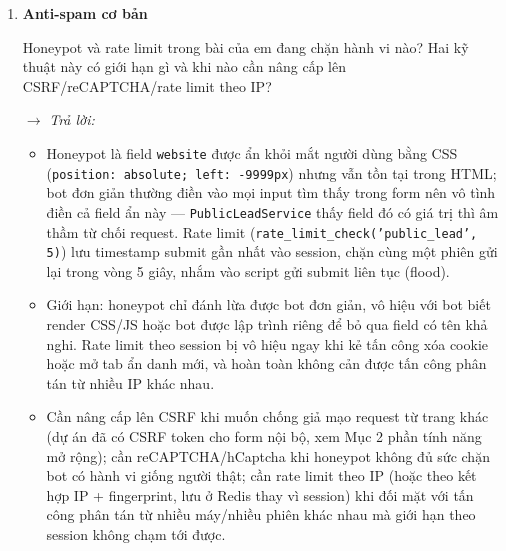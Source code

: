 \begin{enumerate}[label = \textbf{\arabic*.}, leftmargin=*]
    \begin{itemize}[leftmargin = 0.55cm, label = $\bullet$]
        \item Sau \texttt{POST /public-leads} thành công, controller gọi \texttt{redirect('/public-leads/create')} kèm \texttt{flash\_set('success', ...)}. Sau \texttt{POST /leads/store}, \texttt{/leads/update}, \texttt{/leads/delete} (và tương tự cho \texttt{/payments/*}), controller đều \texttt{redirect('/leads')} (hoặc về đúng trang danh sách với query hiện tại) thay vì render HTML ngay trên response của POST.
        \item Nếu render trực tiếp trên POST, trình duyệt sẽ giữ nguyên request đó trong lịch sử: khi người dùng bấm F5 (hoặc bấm Back rồi Forward), trình duyệt hiện hộp thoại ``xác nhận gửi lại form'' — nếu người dùng đồng ý, toàn bộ dữ liệu POST cũ (họ tên, email, số tiền, \ldots) được gửi lại y hệt, tạo thêm một lead hoặc một phiếu thanh toán trùng lặp trong cơ sở dữ liệu mà người dùng không cố ý. Với thao tác xóa, F5 lại có thể vô tình gọi lại đúng lệnh xóa một lần nữa.
    \end{itemize}

    \item \textbf{Anti-spam cơ bản}

    Honeypot và rate limit trong bài của em đang chặn hành vi nào? Hai kỹ thuật này có giới hạn gì và khi nào cần nâng cấp lên CSRF/reCAPTCHA/rate limit theo IP?

    \hspace*{-0.6cm} $\rightarrow$ \textit{Trả lời:}

    \begin{itemize}[leftmargin = 0.55cm, label = $\bullet$]
        \item Honeypot là field \texttt{website} được ẩn khỏi mắt người dùng bằng CSS (\texttt{position: absolute; left: -9999px}) nhưng vẫn tồn tại trong HTML; bot đơn giản thường điền vào mọi input tìm thấy trong form nên vô tình điền cả field ẩn này — \texttt{PublicLeadService} thấy field đó có giá trị thì âm thầm từ chối request. Rate limit (\texttt{rate\_limit\_check('public\_lead', 5)}) lưu timestamp submit gần nhất vào session, chặn cùng một phiên gửi lại trong vòng 5 giây, nhắm vào script gửi submit liên tục (flood).
        \item Giới hạn: honeypot chỉ đánh lừa được bot đơn giản, vô hiệu với bot biết render CSS/JS hoặc bot được lập trình riêng để bỏ qua field có tên khả nghi. Rate limit theo session bị vô hiệu ngay khi kẻ tấn công xóa cookie hoặc mở tab ẩn danh mới, và hoàn toàn không cản được tấn công phân tán từ nhiều IP khác nhau.
        \item Cần nâng cấp lên CSRF khi muốn chống giả mạo request từ trang khác (dự án đã có CSRF token cho form nội bộ, xem Mục 2 phần tính năng mở rộng); cần reCAPTCHA/hCaptcha khi honeypot không đủ sức chặn bot có hành vi giống người thật; cần rate limit theo IP (hoặc theo kết hợp IP + fingerprint, lưu ở Redis thay vì session) khi đối mặt với tấn công phân tán từ nhiều máy/nhiều phiên khác nhau mà giới hạn theo session không chạm tới được.
    \end{itemize}


\end{enumerate}

